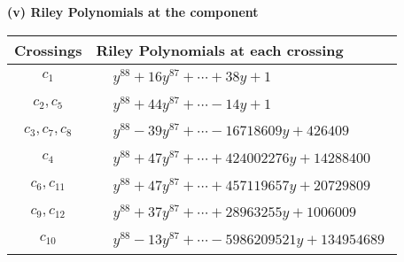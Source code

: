 \documentclass[1p]{elsarticle_modified}
\theoremstyle{definition}
\begin{document}
\flushleft \textbf{(v) Riley Polynomials at the component}\newline \\
\begin{tabular}{m{50pt}|m{274pt}}
Crossings & \hspace{64pt}Riley Polynomials at each crossing \\
\hline $$\begin{aligned}c_{1}\end{aligned}$$&$\begin{aligned}
&y^{88}+16 y^{87}+\cdots+38 y+1
\end{aligned}$\\
\hline $$\begin{aligned}c_{2},c_{5}\end{aligned}$$&$\begin{aligned}
&y^{88}+44 y^{87}+\cdots-14 y+1
\end{aligned}$\\
\hline $$\begin{aligned}c_{3},c_{7},c_{8}\end{aligned}$$&$\begin{aligned}
&y^{88}-39 y^{87}+\cdots-16718609 y+426409
\end{aligned}$\\
\hline $$\begin{aligned}c_{4}\end{aligned}$$&$\begin{aligned}
&y^{88}+47 y^{87}+\cdots+424002276 y+14288400
\end{aligned}$\\
\hline $$\begin{aligned}c_{6},c_{11}\end{aligned}$$&$\begin{aligned}
&y^{88}+47 y^{87}+\cdots+457119657 y+20729809
\end{aligned}$\\
\hline $$\begin{aligned}c_{9},c_{12}\end{aligned}$$&$\begin{aligned}
&y^{88}+37 y^{87}+\cdots+28963255 y+1006009
\end{aligned}$\\
\hline $$\begin{aligned}c_{10}\end{aligned}$$&$\begin{aligned}
&y^{88}-13 y^{87}+\cdots-5986209521 y+134954689
\end{aligned}$\\
\hline
\end{tabular}\\~\\
\end{document}
